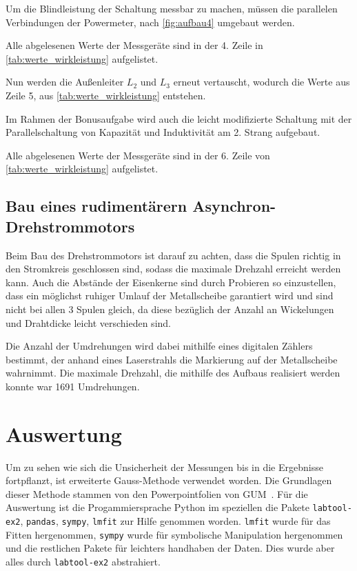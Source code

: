 \documentclass[12pt,english,ngerman]{scrartcl}
\begin{document}
Um die Blindleistung der Schaltung messbar zu machen, müssen die parallelen
Verbindungen der Powermeter, nach \autoref{fig:aufbau4} umgebaut werden.

Alle abgelesenen Werte der Messgeräte sind in der 4. Zeile in
\autoref{tab:werte_wirkleistung} aufgelistet.

Nun werden die Außenleiter $L_2$ und $L_3$ erneut vertauscht, wodurch die Werte
aus Zeile 5, aus \autoref{tab:werte_wirkleistung} entstehen.

Im Rahmen der Bonusaufgabe wird auch die leicht modifizierte Schaltung mit der
Parallelschaltung von Kapazität und Induktivität am 2. Strang aufgebaut.

Alle abgelesenen Werte der Messgeräte sind in der 6. Zeile von
\autoref{tab:werte_wirkleistung} aufgelistet.

\subsection{Bau eines rudimentärern Asynchron-Drehstrommotors}

Beim Bau des Drehstrommotors ist darauf zu achten, dass die Spulen richtig in
den Stromkreis geschlossen sind, sodass die maximale Drehzahl erreicht werden
kann. Auch die Abstände der Eisenkerne sind durch Probieren so einzustellen,
dass ein möglichst ruhiger Umlauf der Metallscheibe garantiert wird und sind
nicht bei allen 3 Spulen gleich, da diese bezüglich der Anzahl an Wickelungen
und Drahtdicke leicht verschieden sind.

Die Anzahl der Umdrehungen wird dabei mithilfe eines digitalen Zählers
bestimmt, der anhand eines Laserstrahls die Markierung auf der Metallscheibe
wahrnimmt. Die maximale Drehzahl, die mithilfe des Aufbaus realisiert werden
konnte war 1691 Umdrehungen.


\section{Auswertung}\label{sec:auswertung}

Um zu sehen wie sich die Unsicherheit der Messungen bis in die Ergebnisse
fortpflanzt, ist erweiterte Gauss-Methode verwendet worden. Die Grundlagen
dieser Methode stammen von den Powerpointfolien von
GUM~\cite{WolfgangKessel2004}. Für die Auswertung ist die Progammiersprache
Python im speziellen die Pakete \verb#labtool-ex2#, \verb#pandas#,
\verb#sympy#, \verb#lmfit# zur Hilfe genommen worden. \verb#lmfit# wurde für
das Fitten hergenommen, \verb#sympy# wurde für symbolische Manipulation
hergenommen und die restlichen Pakete für leichters handhaben der Daten. Dies
wurde aber alles durch \verb#labtool-ex2# abstrahiert.
\end{document}
